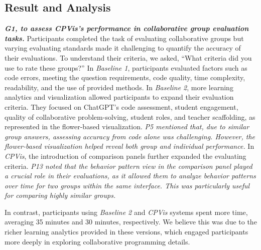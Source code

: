 \subsection{Result and Analysis}

\textbf{\textit{G1, to assess \textit{CPVis}'s performance in collaborative group evaluation tasks.}}
Participants completed the task of evaluating collaborative groups but varying evaluating standards made it challenging to quantify the accuracy of their evaluations. To understand their criteria, we asked, ``What criteria did you use to rate these groups?''
In \textit{Baseline 1}, participants evaluated factors such as code errors, meeting the question requirements, code quality, time complexity, readability, and the use of provided methods. 
In \textit{Baseline 2}, more learning analytics and visualization allowed participants to expand their evaluation criteria. 
They focused on ChatGPT's code assessment, student engagement, quality of collaborative problem-solving, student roles, and teacher scaffolding, as represented in the flower-based visualization. 
\textit{P5 mentioned that, due to similar group answers, assessing accuracy from code alone was challenging. However, the flower-based visualization helped reveal both group and individual performance.}
In \textit{CPVis}, the introduction of comparison panels further expanded the evaluating criteria. \textit{P13 noted that the behavior pattern view in the comparison panel played a crucial role in their evaluations, as it allowed them to analyze behavior patterns over time for two groups within the same interface. This was particularly useful for comparing highly similar groups.} 



In contrast, participants using \textit{Baseline 2} and \textit{CPVis} systems spent more time, averaging 35 minutes and 30 minutes, respectively. We believe this was due to the richer learning analytics provided in these versions, which engaged participants more deeply in exploring collaborative programming details.


